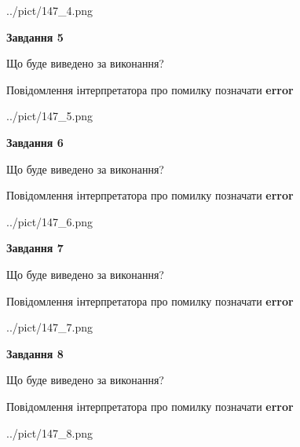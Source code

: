 \documentclass[12pt, ukrainian]{article}
\begin{document}
{\begin{center}
	{../pict/147_4.png}
\end{center}
\newpage

{\begin {center}\textbf{Завдання 5}\end {center}}\par
Що буде виведено за виконання? \par
Повідомлення інтерпретатора про помилку позначати \textbf{error}

\begin{center}
	{../pict/147_5.png}
\end{center}
\newpage

{\begin {center}\textbf{Завдання 6}\end {center}}\par
Що буде виведено за виконання? \par
Повідомлення інтерпретатора про помилку позначати \textbf{error}

\begin{center}
	{../pict/147_6.png}
\end{center}
\newpage

{\begin {center}\textbf{Завдання 7}\end {center}}\par
Що буде виведено за виконання? \par
Повідомлення інтерпретатора про помилку позначати \textbf{error}

\begin{center}
	{../pict/147_7.png}
\end{center}
\newpage

{\begin {center}\textbf{Завдання 8}\end {center}}\par
Що буде виведено за виконання? \par
Повідомлення інтерпретатора про помилку позначати \textbf{error}

\begin{center}
	{../pict/147_8.png}
\end{center}
\newpage

}
\end{document}
